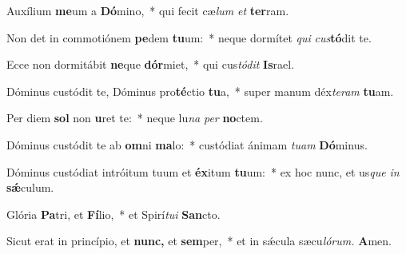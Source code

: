 \item Auxílium \textbf{me}um a \textbf{Dó}mino,~* qui fecit cæ\textit{lum} \textit{et} \textbf{ter}ram.
\item Non det in commotiónem \textbf{pe}dem \textbf{tu}um:~* neque dormítet \textit{qui} \textit{cus}\textbf{tó}dit te.
\item Ecce non dormitábit \textbf{ne}que \textbf{dór}miet,~* qui cus\textit{tódit} \textbf{Is}rael.
\item Dóminus custódit te, Dóminus pro\textbf{té}ctio \textbf{tu}a,~* super manum déx\textit{teram} \textbf{tu}am.
\item Per diem \textbf{sol} non \textbf{u}ret te:~* neque lu\textit{na} \textit{per} \textbf{no}ctem.
\item Dóminus custódit te ab \textbf{om}ni \textbf{ma}lo:~* custódiat ánimam \textit{tuam} \textbf{Dó}minus.
\item Dóminus custódiat intróitum tuum et \textbf{éx}itum \textbf{tu}um:~* ex hoc nunc, et us\textit{que} \textit{in} \textbf{sǽ}culum.
\item Glória \textbf{Pa}tri, et \textbf{Fí}lio,~* et Spirí\hspace{0.03em}\textit{tui} \textbf{San}cto.
\item Sicut erat in princípio, et \textbf{nunc,} et \textbf{sem}per,~* et in sǽcula sæcu\hspace{0.03em}\textit{lórum.} \textbf{A}men.
